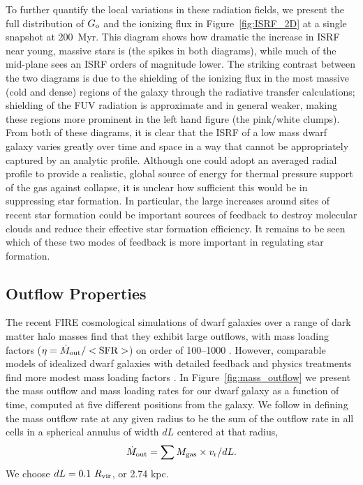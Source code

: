 \documentclass[twocolumn]{aastex61}
\begin{document}
To further quantify the local variations in these radiation fields, we present the full distribution of $G_{\rm o}$ and the  ionizing flux in Figure~\ref{fig:ISRF_2D} at a single snapshot at 200~Myr. This diagram shows how dramatic the increase in ISRF near young, massive stars is (the spikes in both diagrams), while much of the mid-plane sees an ISRF orders of magnitude lower. The striking contrast between the two diagrams is due to the shielding of the  ionizing flux in the most massive (cold and dense) regions of the galaxy through the radiative transfer calculations; shielding of the FUV radiation is approximate and in general weaker, making these regions more prominent in the left hand figure (the pink/white clumps). From both of these diagrams, it is clear that the ISRF of a low mass dwarf galaxy varies greatly over time and space in a way that cannot be appropriately captured by an analytic profile. Although one could adopt an averaged radial profile to provide a realistic, global source of energy for thermal pressure support of the gas against collapse, it is unclear how sufficient this would be in suppressing star formation. In particular, the large increases around sites of recent star formation could be important sources of feedback to destroy molecular clouds and reduce their effective star formation efficiency. It remains to be seen which of these two modes of feedback is more important in regulating star formation.

\subsection{Outflow Properties}
\label{sec:outflows}

The recent FIRE cosmological simulations of dwarf galaxies over a range of dark matter halo masses find that they exhibit large outflows, with mass loading factors ($\eta = \dot{M}_{\rm out}/<\rm{SFR}>$) on order of 100--1000 \citep{Muratov2015}. However, comparable models of idealized dwarf galaxies with detailed feedback and physics treatments find more modest mass loading factors \citep{Hu2016,Hu2017}. In Figure~\ref{fig:mass_outflow} we present the mass outflow and mass loading rates for our dwarf galaxy as a function of time, computed at five different positions from the galaxy. We follow \citet{Muratov2015} in defining the mass outflow rate at any given radius to be the sum of the outflow rate in all cells in a spherical annulus of width $dL$ centered at that radius,
\begin{equation} \label{eq:dotM}
\dot{M}_{\rm out} = \sum M_{\rm gas} \times v_{\rm r} / dL.
\end{equation} 
We choose $dL = 0.1~R_{\rm vir}$, or 2.74 kpc. 
\end{document}
